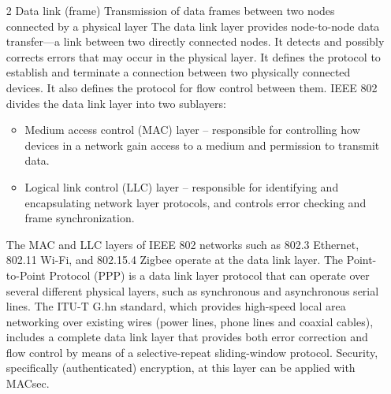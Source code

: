 \documentclass{article}
\begin{document}
\begin{enumerate}[label = \arabic*]
\item[2] Data link (frame) Transmission of data frames between two nodes connected by a physical layer
	\subitem The data link layer provides node-to-node data transfer—a link between two directly connected nodes. It detects and possibly corrects errors that may occur in the physical layer. It defines the protocol to establish and terminate a connection between two physically connected devices. It also defines the protocol for flow control between them. 
	\subitem IEEE 802 divides the data link layer into two sublayers:
	\begin{itemize}
	\item Medium access control (MAC) layer – responsible for controlling how devices in a network gain access to a medium and permission to transmit data.
	\item Logical link control (LLC) layer – responsible for identifying and encapsulating network layer protocols, and controls error checking and frame synchronization.
	\end{itemize}
	\subitem The MAC and LLC layers of IEEE 802 networks such as 802.3 Ethernet, 802.11 Wi-Fi, and 802.15.4 Zigbee operate at the data link layer. The Point-to-Point Protocol (PPP) is a data link layer protocol that can operate over several different physical layers, such as synchronous and asynchronous serial lines. The ITU-T G.hn standard, which provides high-speed local area networking over existing wires (power lines, phone lines and coaxial cables), includes a complete data link layer that provides both error correction and flow control by means of a selective-repeat sliding-window protocol. Security, specifically (authenticated) encryption, at this layer can be applied with MACsec. 


\end{enumerate}
\end{document}
